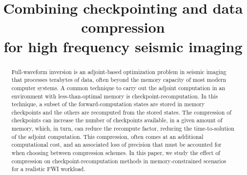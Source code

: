 \documentclass[conference]{IEEEtran}
\begin{document}
\title{Combining checkpointing and data compression\\ for high frequency seismic imaging
}

\author{
\and
{}
\and
{}
\and
{}
\and
{}
\and
{}
}

\maketitle

\begin{abstract}
Full-waveform inversion is an adjoint-based optimization problem in
seismic imaging that processes terabytes of data, often beyond the
memory capacity of most modern computer systems. A common technique to
carry out the adjoint computation in an environment with
less-than-optimal memory is checkpoint-recomputation. In this
technique, a subset of the forward-computation states are stored in
memory checkpoints and the others are recomputed from the stored
states. The compression of checkpoints can increase the number of
checkpoints available, in a given amount of memory, which, in turn,
can reduce the recompute factor, reducing the time-to-solution of the
adjoint computation. This compression, often comes at an additional
computational cost, and an associated loss of precision that must be
accounted for when choosing between compression schemes. In this
paper, we study the effect of compression on checkpoint-recomputation
methods in memory-constrained scenarios for a realistic FWI workload.
\end{abstract}
\end{document}
